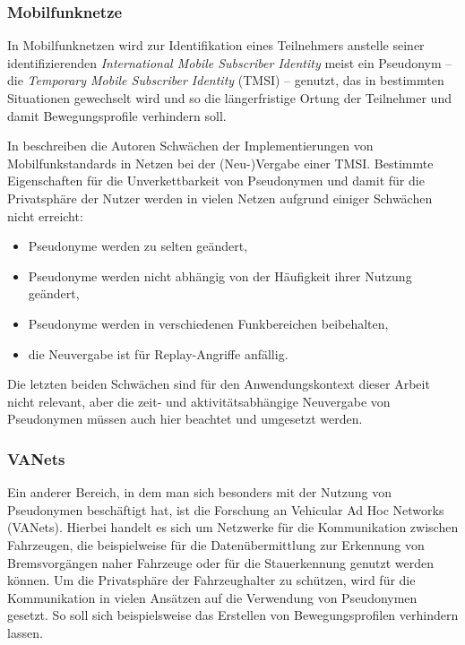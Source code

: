 \subsubsection*{Mobilfunknetze}

In Mobilfunknetzen wird zur Identifikation eines Teilnehmers anstelle seiner identifizierenden \textit{International Mobile Subscriber Identity} meist ein Pseudonym -- die \textit{Temporary Mobile Subscriber Identity} (TMSI) -- genutzt, das in bestimmten Situationen gewechselt wird und so die längerfristige Ortung der Teilnehmer und damit Bewegungsprofile verhindern soll.

In \cite{arapinis2014} beschreiben die Autoren Schwächen der Implementierungen von Mobilfunkstandards in Netzen bei der (Neu-)Vergabe einer TMSI. Bestimmte Eigenschaften für die Unverkettbarkeit von Pseudonymen und damit für die Privatsphäre der Nutzer werden in vielen Netzen aufgrund einiger Schwächen nicht erreicht:
\begin{itemize}
  \item Pseudonyme werden zu selten geändert,
  \item Pseudonyme werden nicht abhängig von der Häufigkeit ihrer Nutzung geändert,
  \item Pseudonyme werden in verschiedenen Funkbereichen beibehalten, 
  \item die Neuvergabe ist für Replay-Angriffe anfällig.
\end{itemize}
Die letzten beiden Schwächen sind für den Anwendungskontext dieser Arbeit nicht relevant, aber die zeit- und aktivitätsabhängige Neuvergabe von Pseudonymen müssen auch hier beachtet und umgesetzt werden.

\subsubsection*{VANets}

Ein anderer Bereich, in dem man sich besonders mit der Nutzung von Pseudonymen beschäftigt hat, ist die Forschung an Vehicular Ad Hoc Networks (VANets). Hierbei handelt es sich um Netzwerke für die Kommunikation zwischen Fahrzeugen, die beispielweise für die Datenübermittlung zur Erkennung von Bremsvorgängen naher Fahrzeuge oder für die Stauerkennung genutzt werden können. Um die Privatsphäre der Fahrzeughalter zu schützen, wird für die Kommunikation in vielen Ansätzen auf die Verwendung von Pseudonymen gesetzt. So soll sich beispielsweise das Erstellen von Bewegungsprofilen verhindern lassen.

